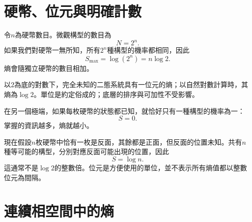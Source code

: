 \section{硬幣、位元與明確計數}

令\(n\)為硬幣數目。微觀構型的數目為
\begin{equation}
 N=2^n.
 \label{eq:sm1-coin-state-count}
\end{equation}
如果我們對硬幣一無所知，所有\(2^n\)種構型的機率都相同，因此
\begin{equation}
 S_{\max}=\log(2^n)=n\log2.
 \label{eq:sm1-coin-max-entropy}
\end{equation}
熵會隨獨立硬幣的數目相加。

以\(2\)為底的對數下，完全未知的二態系統具有一位元的熵；以自然對數計算時，其熵為\(\log2\)。單位是約定俗成的；底層的排序與可加性不受影響。

在另一個極端，如果每枚硬幣的狀態都已知，就恰好只有一種構型的機率為一：
\begin{equation}
 S=0.
\end{equation}
掌握的資訊越多，熵就越小。

現在假設\(n\)枚硬幣中恰有一枚是反面，其餘都是正面，但反面的位置未知。共有\(n\)種等可能的構型，分別對應反面可能出現的位置，因此
\begin{equation}
 S=\log n.
 \label{eq:sm1-one-tail-entropy}
\end{equation}
這通常不是\(\log2\)的整數倍。位元是方便使用的單位，並不表示所有熵值都以整數位元為間隔。

\begin{classroomqa}
\end{classroomqa}

\begin{classroomqa}
\end{classroomqa}

\section{連續相空間中的熵}

